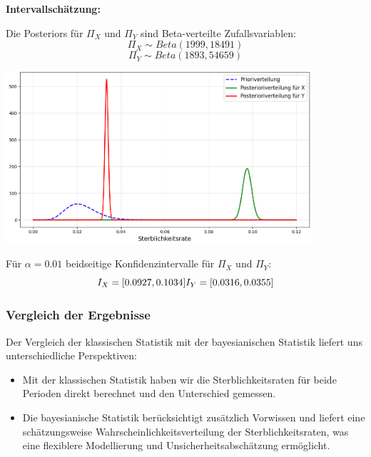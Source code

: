 \documentclass[a4paper,12pt]{article}
\begin{document}
\textbf{Intervallschätzung:}

Die Posteriors für $\Pi_X$ und $\Pi_Y$ sind Beta-verteilte Zufallsvariablen:
\begin{equation}
  \Pi_X \sim Beta(1999, 18491)
\end{equation}
\begin{equation}
  \Pi_Y \sim Beta(1893, 54659)
\end{equation}

\begin{center}
  \includegraphics[width=0.85\textwidth]{../images/semmelweis.png}
\end{center}

Für $\alpha = 0.01$ beidseitige Konfidenzintervalle für $\Pi_X$ und $\Pi_Y$:
\begin{equation}
  I_X = [0.0927, 0.1034] \\
  I_Y = [0.0316, 0.0355]
\end{equation}

\subsubsection{Vergleich der Ergebnisse}
Der Vergleich der klassischen Statistik mit der bayesianischen Statistik liefert uns unterschiedliche Perspektiven:

\begin{itemize}
    \item Mit der klassischen Statistik haben wir die Sterblichkeitsraten für beide Perioden direkt berechnet und den Unterschied gemessen.
    \item Die bayesianische Statistik berücksichtigt zusätzlich Vorwissen und liefert eine schätzungsweise Wahrscheinlichkeitsverteilung 
    der Sterblichkeitsraten, was eine flexiblere Modellierung und Unsicherheitsabschätzung ermöglicht.
\end{itemize}
\newpage
\end{document}
